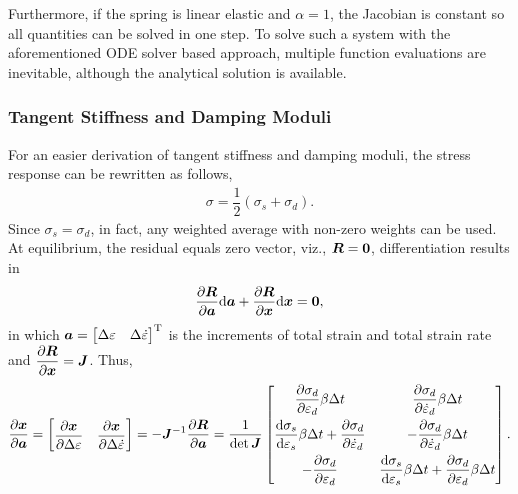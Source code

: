 Furthermore, if the spring is linear elastic and $\alpha=1$, the Jacobian is constant so all quantities can be solved in one step. To solve such a system with the aforementioned ODE solver based approach, multiple function evaluations are inevitable, although the analytical solution is available.
\subsubsection{Tangent Stiffness and Damping Moduli}
For an easier derivation of tangent stiffness and damping moduli, the stress response can be rewritten as follows,
\begin{gather}
\sigma=\dfrac{1}{2}\left(\sigma_s+\sigma_d\right).
\end{gather}
Since $\sigma_s=\sigma_d$, in fact, any weighted average with non-zero weights can be used. At equilibrium, the residual equals zero vector, viz., $\bm{R}=\bm{0}$, differentiation results in
\begin{gather}
\dfrac{\partial{\bm{R}}}{\partial{\bm{a}}}\mathrm{d}\bm{a}+\dfrac{\partial{\bm{R}}}{\partial{\bm{x}}}\mathrm{d}\bm{x}=\bm{0},
\end{gather}
in which $\bm{a}=\begin{bmatrix}
\Delta\varepsilon&\Delta\dot\varepsilon
\end{bmatrix}^{\mathrm{T}}$ is the increments of total strain and total strain rate and $\dfrac{\partial{\bm{R}}}{\partial{\bm{x}}}=\bm{J}$. Thus,
\begin{gather}\label{eq:internal}
\dfrac{\partial{\bm{x}}}{\partial{\bm{a}}}=\begin{bmatrix}\dfrac{\partial{\bm{x}}}{\partial{\Delta\varepsilon}}&\dfrac{\partial{\bm{x}}}{\partial{\Delta\dot\varepsilon}}\end{bmatrix}=-\bm{J}^{-1}\dfrac{\partial{\bm{R}}}{\partial{\bm{a}}}=\dfrac{1}{\det{\bm{J}}}\begin{bmatrix}
	\dfrac{\partial{\sigma_d}}{\partial{\varepsilon_d}}\beta\Delta{}t                                               & \dfrac{\partial{\sigma_d}}{\partial{\dot\varepsilon_d}}\beta\Delta{}t                                                     \\[3mm]
	\dfrac{\mathrm{d}\sigma_s}{\mathrm{d}\varepsilon_s}\beta\Delta{}t+\dfrac{\partial{\sigma_d}}{\partial{\dot\varepsilon_d}} & -\dfrac{\partial{\sigma_d}}{\partial{\dot\varepsilon_d}}\beta\Delta{}t                                                    \\[3mm]
	-\dfrac{\partial{\sigma_d}}{\partial{\varepsilon_d}}                                                            & \dfrac{\mathrm{d}\sigma_s}{\mathrm{d}\varepsilon_s}\beta\Delta{}t+\dfrac{\partial{\sigma_d}}{\partial{\varepsilon_d}}\beta\Delta{}t
\end{bmatrix}.
\end{gather}
